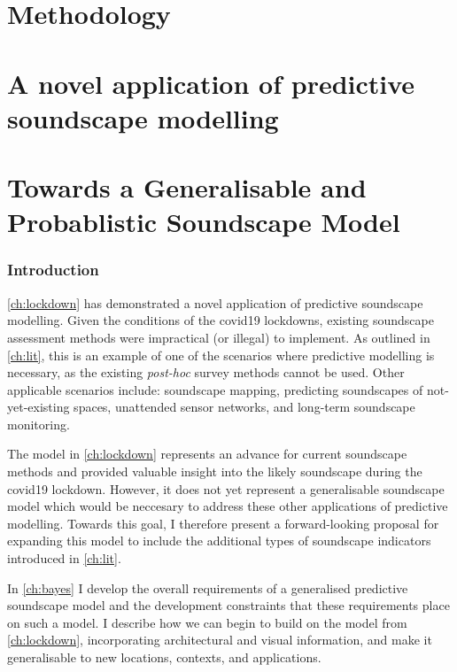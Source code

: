 \documentclass[twoside,fontsize=12pt,titlepage,chapterprefix=true
]{scrbook}
\begin{document}
\mainmatter




\part{Methodology}



\part{A novel application of predictive soundscape modelling}


\part{Towards a Generalisable and Probablistic Soundscape Model}
\label{part:generalModel}
\section*{Introduction}
\cref{ch:lockdown} has demonstrated a novel application of predictive soundscape modelling. Given the conditions of the \gls{covid19} lockdowns, existing soundscape assessment methods were impractical (or illegal) to implement. As outlined in \cref{ch:lit}, this is an example of one of the scenarios where predictive modelling is necessary, as the existing \emph{post-hoc} survey methods cannot be used. Other applicable scenarios include: soundscape mapping, predicting soundscapes of not-yet-existing spaces, unattended sensor networks, and long-term soundscape monitoring. 

The model in \cref{ch:lockdown} represents an advance for current soundscape methods and provided valuable insight into the likely soundscape during the \gls{covid19} lockdown. However, it does not yet represent a generalisable soundscape model which would be neccesary to address these other applications of predictive modelling. Towards this goal, I therefore present a forward-looking proposal for expanding this model to include the additional types of soundscape indicators introduced in \cref{ch:lit}. 

In \cref{ch:bayes} I develop the overall requirements of a generalised predictive soundscape model and the development constraints that these requirements place on such a model. I describe how we can begin to build on the model from \cref{ch:lockdown}, incorporating architectural and visual information, and make it generalisable to new locations, contexts, and applications. 
\end{document}
